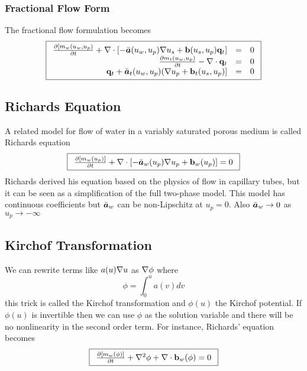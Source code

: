 \documentclass[12pt,dvips,letterpaper]{article}
\begin{document}
\subsubsection{Fractional Flow Form}
The fractional flow formulation becomes
\begin{equation}
\fbox{$ \begin{array}{rcl} 
\frac{\partial {[m_w(u_w,u_p)}}{\partial {t}} + \nabla \cdot [  - \bar{\mbox{{\boldmath ${a}$}}}(u_w,u_p) \nabla u_s + {\bf b}(u_s,u_p) {\bf q}_t  ] &=& 0 \\
\frac{\partial {m_t(u_w,u_p)}}{\partial {t}} - \nabla \cdot  {\bf q}_t &=& 0 \\
{\bf q}_t + \bar{\mbox{{\boldmath ${a}$}}}_t(u_w,u_p)  (\nabla u_p + {\bf b}_t(u_s,u_p) ] &=& 0\\  \end{array} $}
\end{equation}

\subsection{Richards Equation}

A related model for flow of water in a variably saturated porous
medium is called Richards equation
\begin{equation}
\fbox{$ \begin{array}{rcl} 
\frac{\partial {[m_w(u_p)]}}{\partial {t}} + \nabla \cdot \left[ - \bar{\mbox{{\boldmath ${a}$}}}_w ( u_p) \nabla u_p + {\bf b}_w(u_p) \right] = 0  \end{array} $}
\end{equation}
Richards derived his equation based on the physics of flow in
capillary tubes, but it can be seen as a simplification of the full
two-phase model. This model has continuous coefficients but $\bar{\mbox{{\boldmath ${a}$}}}_w$ can be non-Lipschitz at $u_p=0$. Also $\bar{\mbox{{\boldmath ${a}$}}}_w \rightarrow 0$ as $u_p \rightarrow - \infty$

\subsection{Kirchof Transformation}

We can rewrite terms like $a(u) \nabla u$ as $\nabla \phi$ where 
\begin{equation*}
\phi = \int_0^u a(v) dv
\end{equation*}
this trick is called the Kirchof transformation and $\phi(u)$
the Kirchof potential. If $\phi(u)$ is invertible then we can use
$\phi$ as the solution variable and there will be no nonlinearity in
the second order term. For instance, Richards' equation becomes
\begin{equation}
\fbox{$ \begin{array}{rcl} 
\frac{\partial {[m_w(\phi)]}}{\partial {t}} + \nabla^2 \phi +  \nabla \cdot {\bf b}_w(\phi)  = 0 
 \end{array} $}
\end{equation}
\end{document}
